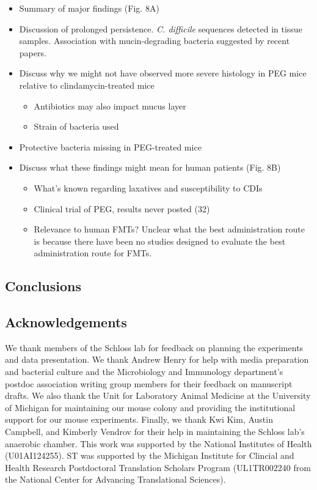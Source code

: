\documentclass[
  11pt,
]{article}
\providecommand{\tightlist}{%
  \setlength{\itemsep}{0pt}\setlength{\parskip}{0pt}}
\begin{document}
\begin{itemize}
\item
  Summary of major findings (Fig. 8A)
\item
  Discussion of prolonged persistence. \emph{C. difficile} sequences
  detected in tissue samples. Association with mucin-degrading bacteria
  suggested by recent papers.
\item
  Discuss why we might not have observed more severe histology in PEG
  mice relative to clindamycin-treated mice

  \begin{itemize}
  \tightlist
  \item
    Antibiotics may also impact mucus layer
  \item
    Strain of bacteria used
  \end{itemize}
\item
  Protective bacteria missing in PEG-treated mice
\item
  Discuss what these findings might mean for human patients (Fig. 8B)

  \begin{itemize}
  \tightlist
  \item
    What's known regarding laxatives and susceptibility to CDIs
  \item
    Clinical trial of PEG, results never posted (32)
  \item
    Relevance to human FMTs? Unclear what the best administration route
    is because there have been no studies designed to evaluate the best
    administration route for FMTs.
  \end{itemize}
\end{itemize}

\hypertarget{conclusions}{%
\subsection{Conclusions}\label{conclusions}}

\hypertarget{acknowledgements}{%
\subsection{Acknowledgements}\label{acknowledgements}}

We thank members of the Schloss lab for feedback on planning the
experiments and data presentation. We thank Andrew Henry for help with
media preparation and bacterial culture and the Microbiology and
Immunology department's postdoc association writing group members for
their feedback on manuscript drafts. We also thank the Unit for
Laboratory Animal Medicine at the University of Michigan for maintaining
our mouse colony and providing the institutional support for our mouse
experiments. Finally, we thank Kwi Kim, Austin Campbell, and Kimberly
Vendrov for their help in maintaining the Schloss lab's anaerobic
chamber. This work was supported by the National Institutes of Health
(U01AI124255). ST was supported by the Michigan Institute for Clincial
and Health Research Postdoctoral Translation Scholars Program
(UL1TR002240 from the National Center for Advancing Translational
Sciences).
\end{document}
